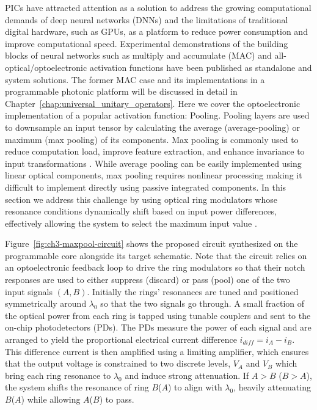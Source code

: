 PICs have attracted attention as a solution to address the growing computational demands of deep neural networks (DNNs) and the limitations of traditional digital hardware, such as GPUs, as a platform to reduce power consumption and improve computational speed.
Experimental demonstrations of the building blocks of neural networks such as multiply and accumulate (MAC) \cite{feldmann_parallel_2021,tait_neuromorphic_2017,ashtiani_-chip_2022} and all-optical/optoelectronic activation functions \cite{jha_reconfigurable_2020} have been published as standalone and system solutions.
The former MAC case and its implementations in a programmable photonic platform will be discussed in detail in Chapter~\ref{chap:universal_unitary_operators}.
Here we cover the optoelectronic implementation of a popular activation function: Pooling.
Pooling layers are used to downsample an input tensor by calculating the average (average-pooling) or maximum (max pooling) of its components.
Max pooling is commonly used to reduce computation load, improve feature extraction, and enhance invariance to input transformations \cite{murray_generalized_2014,zhang_winner-take-all_2020}.
While average pooling can be easily implemented using linear optical components, max pooling requires nonlinear processing making it difficult to implement directly using passive integrated components.
In this section we address this challenge by using optical ring modulators whose resonance conditions dynamically shift based on input power differences, effectively allowing the system to select the maximum input value \cite{ashtiani_photonic_2023}.

Figure~\ref{fig:ch3-maxpool-circuit} shows the proposed circuit synthesized on the programmable core alongside its target schematic.
Note that the circuit relies on an optoelectronic feedback loop to drive the ring modulators so that their notch responses are used to either suppress (discard) or pass (pool) one of the two input signals $(A,B)$.
Initially the rings' resonances are tuned and positioned symmetrically around \(\lambda_0\) so that the two signals go through.
A small fraction of the optical power from each ring is tapped using tunable couplers and sent to the on-chip photodetectors (PDs).
The PDs measure the power of each signal and are arranged to yield the proportional electrical current difference \(i_{diff} = i_A - i_B\).
This difference current is then amplified using a limiting amplifier, which ensures that the output voltage is constrained to two discrete levels, \(V_A\) and \(V_B\) which bring each ring resonance to \(\lambda_0\) and induce strong attenuation.
If \(A>B\) (\(B>A\)), the system shifts the resonance of ring \(B\)($A$) to align with \(λ_0\), heavily attenuating \(B\)($A$) while allowing \(A\)($B$) to pass.

